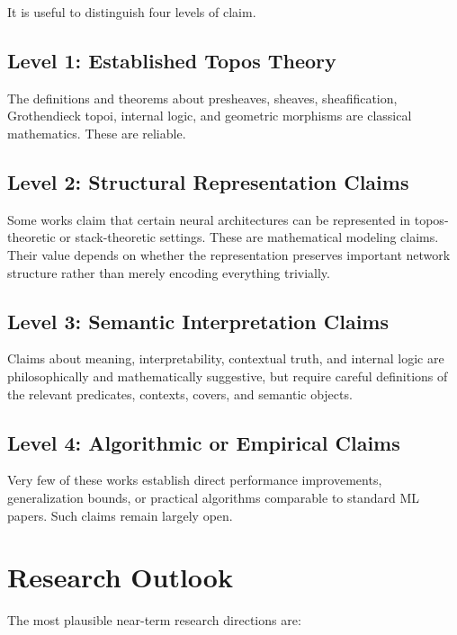 \documentclass[11pt]{article}
\begin{document}
It is useful to distinguish four levels of claim.


\subsection{Level 1: Established Topos Theory}

The definitions and theorems about presheaves, sheaves, sheafification, Grothendieck topoi, internal logic, and geometric morphisms are classical mathematics. These are reliable.


\subsection{Level 2: Structural Representation Claims}

Some works claim that certain neural architectures can be represented in topos-theoretic or stack-theoretic settings. These are mathematical modeling claims. Their value depends on whether the representation preserves important network structure rather than merely encoding everything trivially.


\subsection{Level 3: Semantic Interpretation Claims}

Claims about meaning, interpretability, contextual truth, and internal logic are philosophically and mathematically suggestive, but require careful definitions of the relevant predicates, contexts, covers, and semantic objects.


\subsection{Level 4: Algorithmic or Empirical Claims}

Very few of these works establish direct performance improvements, generalization bounds, or practical algorithms comparable to standard ML papers. Such claims remain largely open.


\section{Research Outlook}

The most plausible near-term research directions are:
\end{document}
